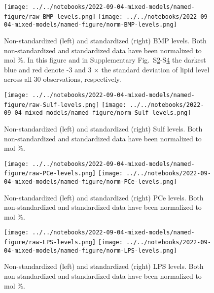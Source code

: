 \documentclass[letterpaper]{article}
\begin{document}
\setcounter{figure}{0}
\makeatletter 
\renewcommand{\figurename}{Supplementary Figure S} %
\makeatother

\begin{figure}[p]
	\texttt{[image: ../../notebooks/2022-09-04-mixed-models/named-figure/raw-BMP-levels.png]}
	\texttt{[image: ../../notebooks/2022-09-04-mixed-models/named-figure/norm-BMP-levels.png]}
	\caption[Non-standardized and standardized BMP levels]{
	Non-standardized (left) and standardized (right) BMP levels.  Both
	non-standardized and standardized data have been normalized to mol \%.  In
	this figure and in Supplementary Fig.~S\ref{fig:heatmap-Sulf}-S\ref{fig:heatmap-LPS} the
	darkest blue and red denote -3 and 3 $\times$ the standard deviation of
	lipid level across all 30 observations, respectively.
}
\label{fig:heatmap-BMP}
\end{figure}

\begin{figure}[p]
	\texttt{[image: ../../notebooks/2022-09-04-mixed-models/named-figure/raw-Sulf-levels.png]}
	\texttt{[image: ../../notebooks/2022-09-04-mixed-models/named-figure/norm-Sulf-levels.png]}
	\caption[Raw and standardized Sulf levels]{
	Non-standardized (left) and standardized (right) Sulf levels.  Both
	non-standardized and standardized data have been normalized to mol \%.  
}
\label{fig:heatmap-Sulf}
\end{figure}

\begin{figure}[p]
	\texttt{[image: ../../notebooks/2022-09-04-mixed-models/named-figure/raw-PCe-levels.png]}
	\texttt{[image: ../../notebooks/2022-09-04-mixed-models/named-figure/norm-PCe-levels.png]}
	\caption[Raw and standardized PCe levels]{
	Non-standardized (left) and standardized (right) PCe levels.  Both
	non-standardized and standardized data have been normalized to mol \%.  
}
\label{fig:heatmap-PCe}
\end{figure}

\begin{figure}[p]
	\texttt{[image: ../../notebooks/2022-09-04-mixed-models/named-figure/raw-LPS-levels.png]}
	\texttt{[image: ../../notebooks/2022-09-04-mixed-models/named-figure/norm-LPS-levels.png]}
	\caption[Raw and standardized LPS levels]{
	Non-standardized (left) and standardized (right) LPS levels.  Both
	non-standardized and standardized data have been normalized to mol \%.  
}
\label{fig:heatmap-LPS}
\end{figure}
\end{document}
